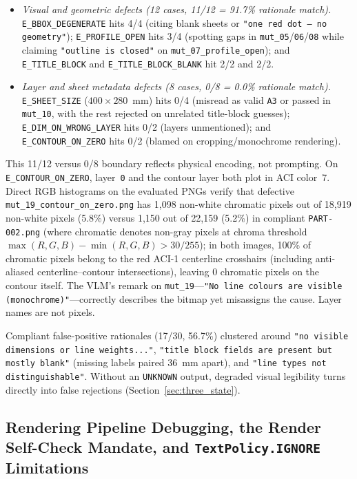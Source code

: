 \documentclass[nocopyright,nolists,upint,varvw,hyphenate]{asmejour}
\begin{document}
\begin{itemize}
\item \emph{Visual and geometric defects (12 cases, 11/12 = 91.7\% rationale match).} \texttt{E\_BBOX\_DEGENERATE} hits 4/4 (citing blank sheets or \texttt{"one red dot --- no geometry"}); \texttt{E\_PROFILE\_OPEN} hits 3/4 (spotting gaps in \texttt{mut\_05}/\texttt{06}/\texttt{08} while claiming \texttt{"outline is closed"} on \texttt{mut\_07\_profile\_open}); and \texttt{E\_TITLE\_BLOCK} and \texttt{E\_TITLE\_BLOCK\_BLANK} hit 2/2 and 2/2.
\item \emph{Layer and sheet metadata defects (8 cases, 0/8 = 0.0\% rationale match).} \texttt{E\_SHEET\_SIZE} ($400 \times 280$~mm) hits 0/4 (misread as valid \texttt{A3} or passed in \texttt{mut\_10}, with the rest rejected on unrelated title-block guesses); \texttt{E\_DIM\_ON\_WRONG\_LAYER} hits 0/2 (layers unmentioned); and \texttt{E\_CONTOUR\_ON\_ZERO} hits 0/2 (blamed on cropping/monochrome rendering).
\end{itemize}

This 11/12 versus 0/8 boundary reflects physical encoding, not prompting. On \texttt{E\_CONTOUR\_ON\_ZERO}, layer~\texttt{0} and the contour layer both plot in ACI color~7. Direct RGB histograms on the evaluated PNGs verify that defective \texttt{mut\_19\_contour\_on\_zero.png} has 1,098 non-white chromatic pixels out of 18,919 non-white pixels (5.8\%) versus 1,150 out of 22,159 (5.2\%) in compliant \texttt{PART-002.png} (where chromatic denotes non-gray pixels at chroma threshold $\max(R,G,B) - \min(R,G,B) > 30/255$); in both images, 100\% of chromatic pixels belong to the red ACI-1 centerline crosshairs (including anti-aliased centerline--contour intersections), leaving 0 chromatic pixels on the contour itself. The VLM's remark on \texttt{mut\_19}---\texttt{"No line colours are visible (monochrome)"}---correctly describes the bitmap yet misassigns the cause. Layer names are not pixels.

Compliant false-positive rationales (17/30, 56.7\%) clustered around \texttt{"no visible dimensions or line weights..."}, \texttt{"title block fields are present but mostly blank"} (missing labels paired 36~mm apart), and \texttt{"line types not distinguishable"}. Without an \texttt{UNKNOWN} output, degraded visual legibility turns directly into false rejections (Section~\ref{sec:three_state}).

\subsection{Rendering Pipeline Debugging, the Render Self-Check Mandate, and \texttt{TextPolicy.IGNORE} Limitations}\label{sec:render_debug}
\end{document}
